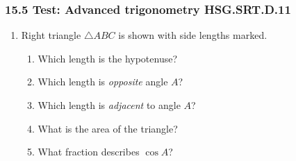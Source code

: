 

\fancyhead[LE]{\thepage}



\subsubsection*{15.5 Test: Advanced trigonometry \hfill HSG.SRT.D.11}

\begin{enumerate}
  \item Right triangle $\triangle ABC$ is shown with side lengths marked.
  \begin{multicols}{2}
    \begin{enumerate}
      \item Which length is the hypotenuse? \vspace{0.5cm}
      \item Which length is \emph{opposite} angle $A$?  \vspace{0.5cm}
      \item Which length is \emph{adjacent} to angle $A$? %
      \item What is the area of the triangle? \vspace{1cm}
      \item What fraction describes $\cos A$? \vspace{1cm}
    \end{enumerate}
  \begin{flushright}
  \end{flushright}
  \end{multicols}
  

\end{enumerate}
